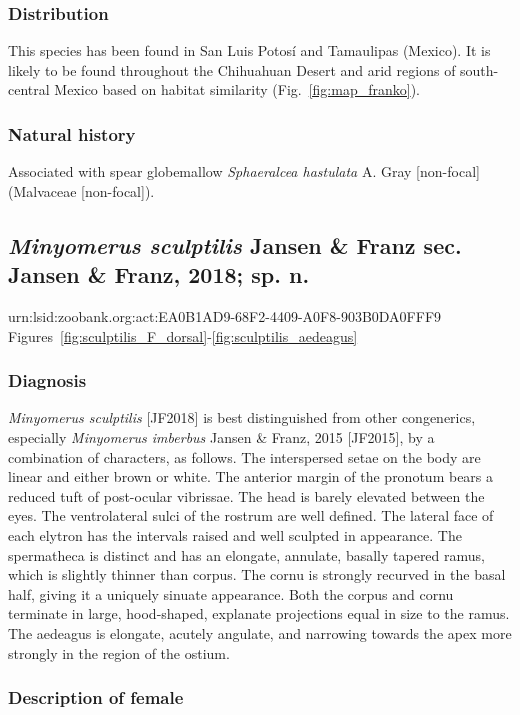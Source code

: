 \documentclass[fleqn,10pt,lineno]{wlpeerj} %
\begin{document}
		\subsubsection*{Distribution}
			This species has been found in San Luis Potos\'{i} and Tamaulipas (Mexico).
			It is likely to be found throughout the Chihuahuan Desert and arid regions of south-central Mexico based on habitat similarity (Fig.~\ref{fig:map_franko}).
		\subsubsection*{Natural history}
			Associated with spear globemallow \textit{Sphaeralcea hastulata} A. Gray [non-focal] (Malvaceae [non-focal]).

	\subsection*{\textit{Minyomerus sculptilis} Jansen \& Franz sec. Jansen \& Franz, 2018; sp. n.}\label{ssec:sculpt}
		urn:lsid:zoobank.org:act:EA0B1AD9-68F2-4409-A0F8-903B0DA0FFF9\\
		Figures~\ref{fig:sculptilis_F_dorsal}-\ref{fig:sculptilis_aedeagus}
		\subsubsection*{Diagnosis}
			\textit{Minyomerus sculptilis} [JF2018] is best distinguished from other congenerics, especially \textit{Minyomerus imberbus} Jansen \& Franz, 2015 [JF2015], by a combination of characters, as follows.
			The interspersed setae on the body are linear and either brown or white.
			The anterior margin of the pronotum bears a reduced tuft of post-ocular vibrissae.
			The head is barely elevated between the eyes.
			The ventrolateral sulci of  the rostrum are well defined.
			The lateral face of each elytron has the intervals raised and well sculpted in appearance.
			The spermatheca is distinct and has an elongate, annulate, basally tapered ramus, which is slightly thinner than corpus.
			The cornu is strongly recurved in the basal half, giving it a uniquely sinuate appearance.
			Both the corpus and cornu terminate in large, hood-shaped, explanate projections equal in size to the ramus.
			The aedeagus is elongate, acutely angulate, and narrowing towards the apex more strongly in the region of the ostium.
		\subsubsection*{Description of female}
\end{document}

